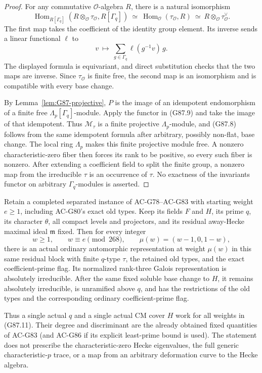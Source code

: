 \begin{proof}
For any commutative \(\mathcal O\)-algebra \(R\), there is a natural
isomorphism
\[
 \operatorname{Hom}_{R[\Gamma_q]}
       (R\otimes_{\mathcal O}\tau_{\mathcal O},R[\Gamma_q])
 \ \simeq\
 \operatorname{Hom}_{\mathcal O}(\tau_{\mathcal O},R)
 \ \simeq\ R\otimes_{\mathcal O}\tau_{\mathcal O}^{\vee}.
 \tag{G87.9}
\]
The first map takes the coefficient of the identity group element.
Its inverse sends a linear functional \(\ell\) to
\[
 v\ \longmapsto\ \sum_{g\in\Gamma_q}\ell(g^{-1}v)\,g.
 \tag{G87.10}
\]
The displayed formula is equivariant, and direct substitution checks
that the two maps are inverse.
Since \(\tau_{\mathcal O}\) is finite free, the second map is an
isomorphism and is compatible with every base change.

By Lemma~\ref{lem:G87-projective}, \(P\) is the image of an idempotent
endomorphism of a finite free \(\Lambda_p[\Gamma_q]\)-module.
Apply the functor in (G87.9) and take the image of that idempotent.
Thus \(\mathcal M_\tau\) is a finite projective \(\Lambda_p\)-module,
and (G87.8) follows from the same idempotent formula after arbitrary,
possibly non-flat, base change.
The local ring \(\Lambda_p\) makes this finite projective module free.
A nonzero characteristic-zero fiber then forces its rank to be
positive, so every such fiber is nonzero.
After extending a coefficient field to split the finite group,
a nonzero map from the irreducible \(\tau\) is an occurrence of
\(\tau\). No exactness of the invariants functor on arbitrary
\(\Gamma_q\)-modules is asserted.
\end{proof}

\begin{theorem}[AC-G87: one fixed host for a symmetric weight progression]
\label{thm:G87}
Retain a completed separated instance of AC-G78--AC-G83 with starting
weight \(e\ge1\), including AC-G80's exact old types.
Keep its fields \(F\) and \(H\), its prime \(q\), its character
\(\theta\), all compact levels and projectors, and its residual
away-Hecke maximal ideal \(\mathfrak m\) fixed.
Then for every integer
\[
 w\ge1,\qquad w\equiv e\pmod{268},
 \qquad \mu(w)=(w-1,0,1-w),
 \tag{G87.11}
\]
there is an actual ordinary automorphic representation at weight
\(\mu(w)\) in this same residual block with finite \(q\)-type \(\tau\),
the retained old types, and the exact coefficient-prime flag.
Its normalized rank-three Galois representation is absolutely
irreducible.
After the same fixed soluble base change to \(H\), it remains
absolutely irreducible, is unramified above \(q\), and has the
restrictions of the old types and the corresponding ordinary
coefficient-prime flag.

Thus a single actual \(q\) and a single actual CM cover \(H\) work
for all weights in (G87.11). Their degree and discriminant are the
already obtained fixed quantities of AC-G83 (and AC-G86 if its
explicit least-prime bound is used).
The statement does not prescribe the characteristic-zero Hecke
eigenvalues, the full generic characteristic-\(p\) trace, or a map
from an arbitrary deformation curve to the Hecke algebra.
\end{theorem}

